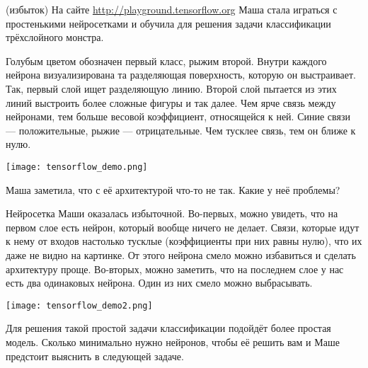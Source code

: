 \begin{problem}{(избыток)}
На сайте \url{http://playground.tensorflow.org} Маша стала играться с простенькими нейросетками и  обучила для решения задачи классификации трёхслойного монстра. 

Голубым цветом обозначен первый класс, рыжим второй. Внутри каждого нейрона визуализирована та разделяющая поверхность, которую он выстраивает. Так, первый слой ищет разделяющую линию. Второй слой пытается из этих линий выстроить более сложные фигуры и так далее. Чем ярче связь между нейронами, тем больше весовой коэффициент, относящейся к ней. Синие связи --- положительные, рыжие --- отрицательные. Чем тусклее связь, тем он ближе к нулю.

\begin{center} 
\texttt{[image: tensorflow\_demo.png]}
\end{center} 

Маша заметила, что с её архитектурой что-то не так. Какие у неё проблемы?
\end{problem} 

\begin{sol}
Нейросетка Маши оказалась избыточной. Во-первых, можно увидеть, что на первом слое есть нейрон, который вообще ничего не делает. Связи, которые идут к нему от входов настолько тусклые (коэффициенты при них равны нулю), что их даже не видно на картинке. От этого нейрона смело можно избавиться и сделать архитектуру проще.  Во-вторых, можно заметить, что на последнем слое у нас есть два одинаковых нейрона. Один из них смело можно выбрасывать. 

\begin{center} 
\texttt{[image: tensorflow\_demo2.png]}
\end{center} 


Для решения такой простой задачи классификации подойдёт более простая модель. Сколько минимально нужно нейронов, чтобы её решить вам и Маше предстоит выяснить в следующей задаче. 
\end{sol}



